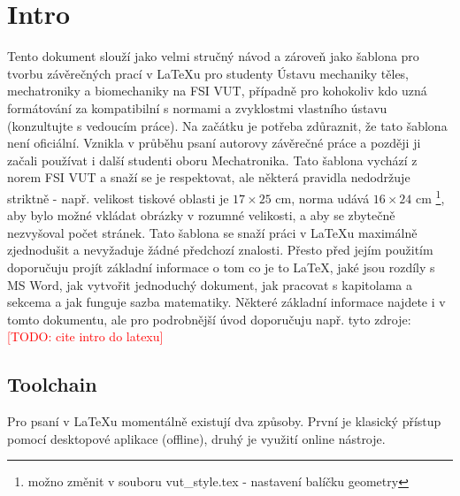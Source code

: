 \chapter{Intro}
\label{chap:intro}
Tento dokument slouží jako velmi stručný návod a zároveň jako šablona pro tvorbu závěrečných prací v LaTeXu pro studenty Ústavu mechaniky těles, mechatroniky a biomechaniky na FSI VUT, případně pro kohokoliv kdo uzná formátování za kompatibilní s normami a zvyklostmi vlastního ústavu (konzultujte s vedoucím práce).
%
Na začátku je potřeba zdůraznit, že tato šablona není oficiální. Vznikla v průběhu psaní autorovy závěrečné práce a později ji začali používat i další studenti oboru Mechatronika. Tato šablona vychází z norem FSI VUT a snaží se je respektovat, ale některá pravidla nedodržuje striktně - např. velikost tiskové oblasti je $17\times25$ cm, norma udává $16\times24$ cm \footnote{možno změnit v souboru vut\_style.tex - nastavení balíčku geometry}, aby bylo možné vkládat obrázky v rozumné velikosti, a aby se zbytečně nezvyšoval počet stránek.
%
Tato šablona se snaží práci v LaTeXu maximálně zjednodušit a nevyžaduje žádné předchozí znalosti. Přesto před jejím použitím doporučuju projít základní informace o tom co je to LaTeX, jaké jsou rozdíly s MS Word, jak vytvořit jednoduchý dokument, jak pracovat s kapitolama a sekcema a jak funguje sazba matematiky. Některé základní informace najdete i v tomto dokumentu, ale pro podrobnější úvod doporučuju např. tyto zdroje: \textcolor{red}{[TODO: cite intro do latexu]} 
%

\section{Toolchain}
\label{sec:Toolchain}
Pro psaní v LaTeXu momentálně existují dva způsoby.  První je klasický přístup pomocí desktopové aplikace (offline), druhý je využití online nástroje.

